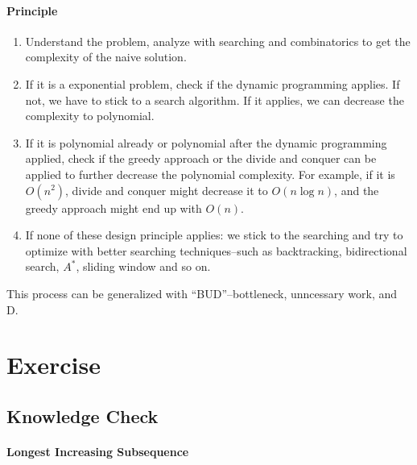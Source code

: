 \documentclass[../main.tex]{subfiles}
\begin{document}
\paragraph{Principle} 
\begin{enumerate}
    \item Understand the problem, analyze with searching and combinatorics to get the complexity of the naive solution.
    \item If it is a exponential problem, check if the dynamic programming applies. If not, we have to stick to a search algorithm. If it applies, we can decrease the complexity to polynomial. 
    \item If it is polynomial already or polynomial after the dynamic programming applied, check if the greedy approach or the divide and conquer can be applied to further decrease the polynomial complexity. For example, if it is $O(n^2)$, divide and conquer might decrease it to $O(n\log n)$, and the greedy approach might end up with $O(n)$. 
    \item If none of these design principle applies: we stick to the searching and try to optimize with better searching techniques--such as backtracking, bidirectional search, $A^{*}$, sliding window and so on. 
\end{enumerate}
This process can be generalized with ``BUD''--bottleneck, unncessary work, and D. 



\section{Exercise}
\subsection{Knowledge Check}
\paragraph{Longest Increasing Subsequence} 
\end{document}

